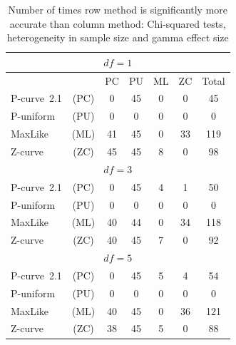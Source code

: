 \documentclass[jou]{apa6} %
\begin{document}
\begin{table} %
\caption{Number of times row method is significantly more accurate than column method: Chi-squared tests, heterogeneity in sample size and gamma effect size}
{\small
\begin{center}
\begin{tabular}{l c ccccc }  \hline
\multicolumn{7}{c}{$df=1$} \\ \hline
& &       PC & PU & ML & ZC & Total  \\
P-curve~2.1   & (PC)   &  0       & 45      & 0     &  0  &  45  \\
P-uniform & (PU)   &  0       &  0      & 0     &  0  &   0  \\
MaxLike   & (ML)   & 41       & 45      & 0     & 33  & 119  \\
Z-curve   & (ZC)   & 45       & 45      & 8     &  0  &  98  \\ \hline
\multicolumn{7}{c}{$df=3$} \\ \hline
P-curve~2.1   & (PC)   &  0       & 45      &  4    &  1  &  50  \\
P-uniform & (PU)   &  0       &  0      &  0    &  0  &   0  \\
MaxLike   & (ML)   & 40       & 44      &  0    & 34  & 118  \\
Z-curve   & (ZC)   & 40       & 45      &  7    &  0  &  92  \\ \hline
\multicolumn{7}{c}{$df=5$} \\ \hline
P-curve~2.1   & (PC)  &   0       & 45      &  5    &  4  &  54  \\
P-uniform & (PU)  &   0       &  0      &  0    &  0  &   0  \\
MaxLike   & (ML)  &   40      & 45      &  0    & 36  & 121  \\
Z-curve   & (ZC)  &   38      & 45      &  5    &  0  &  88  \\ \hline
\end{tabular}
\end{center}
} %
\label{heteroChisqContest}  %
\end{table}
% 
\end{document}
